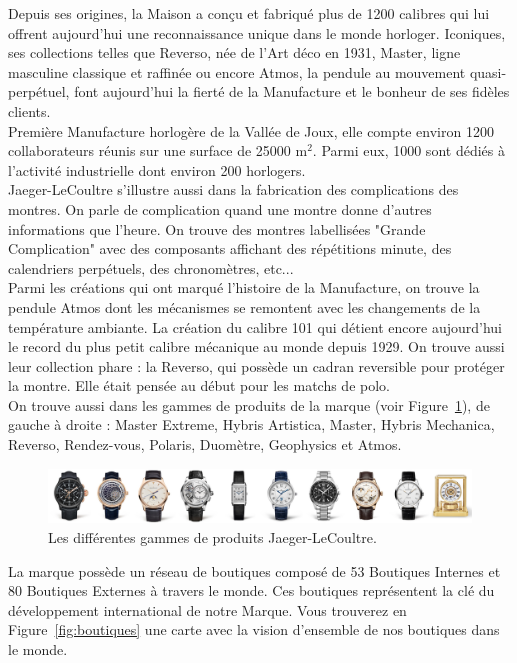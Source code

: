 Depuis ses origines, la Maison a conçu et fabriqué plus de 1200 calibres qui lui offrent aujourd'hui une reconnaissance unique dans le monde horloger. Iconiques, ses collections telles que Reverso, née de l'Art déco en 1931, Master, ligne masculine classique et raffinée ou encore Atmos, la pendule au mouvement quasi-perpétuel, font aujourd'hui la fierté de la Manufacture et le bonheur de ses fidèles clients. \\

Première Manufacture horlogère de la Vallée de Joux, elle compte environ 1200 collaborateurs réunis sur une surface de 25000 m$^{2}$. Parmi eux, 1000 sont dédiés à l’activité industrielle dont environ 200 horlogers. \\

Jaeger-LeCoultre s'illustre aussi dans la fabrication des complications des montres. On parle de complication quand une montre donne d'autres informations que l'heure. On trouve des montres labellisées "Grande Complication" avec des composants affichant des répétitions minute, des calendriers perpétuels, des chronomètres, etc... \\

Parmi les créations qui ont marqué l'histoire de la Manufacture, on trouve la pendule Atmos dont les mécanismes se remontent avec les changements de la température ambiante. La création du calibre 101 qui détient encore aujourd'hui le record du plus petit calibre mécanique au monde depuis 1929. On trouve aussi leur collection phare : la Reverso, qui possède un cadran reversible pour protéger la montre. Elle était pensée au début pour les matchs de polo. \\
On trouve aussi dans les gammes de produits de la marque (voir Figure~\ref{fig:products}), de gauche à droite : Master Extreme, Hybris Artistica, Master, Hybris Mechanica, Reverso, Rendez-vous, Polaris, Duomètre, Geophysics et Atmos.

\begin{figure}[ht]
    \centering
    \includegraphics[width=\textwidth]{images/all_products.png}
    \caption{Les différentes gammes de produits Jaeger-LeCoultre.}
    \label{fig:products}
\end{figure}

La marque possède un réseau de boutiques composé de 53 Boutiques Internes et 80 Boutiques Externes à travers le monde. Ces boutiques représentent la clé du développement international de notre Marque. Vous trouverez en Figure~\ref{fig:boutiques} une carte avec la vision d'ensemble de nos boutiques dans le monde.

